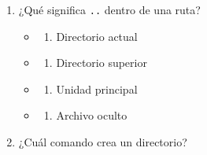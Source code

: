\documentclass[
  spanish,
  letterpaper,
]{scrbook}
\providecommand{\tightlist}{%
  \setlength{\itemsep}{0pt}\setlength{\parskip}{0pt}}
\begin{document}
\begin{enumerate}
  \begin{itemize}
  \tightlist
  \item
    \begin{enumerate}
    \def\labelenumii{\alph{enumii})}
    \tightlist
    \item
      \texttt{show}
    \end{enumerate}
  \item
    \begin{enumerate}
    \def\labelenumii{\alph{enumii})}
    \setcounter{enumii}{1}
    \tightlist
    \item
      \texttt{list}
    \end{enumerate}
  \item
    \begin{enumerate}
    \def\labelenumii{\alph{enumii})}
    \setcounter{enumii}{2}
    \tightlist
    \item
      \texttt{dir}
    \end{enumerate}
  \item
    \begin{enumerate}
    \def\labelenumii{\alph{enumii})}
    \setcounter{enumii}{3}
    \tightlist
    \item
      \texttt{type}
    \end{enumerate}
  \end{itemize}
\item
  ¿Qué significa \texttt{..} dentro de una ruta?

  \begin{itemize}
  \tightlist
  \item
    \begin{enumerate}
    \def\labelenumii{\alph{enumii})}
    \tightlist
    \item
      Directorio actual
    \end{enumerate}
  \item
    \begin{enumerate}
    \def\labelenumii{\alph{enumii})}
    \setcounter{enumii}{1}
    \tightlist
    \item
      Directorio superior
    \end{enumerate}
  \item
    \begin{enumerate}
    \def\labelenumii{\alph{enumii})}
    \setcounter{enumii}{2}
    \tightlist
    \item
      Unidad principal
    \end{enumerate}
  \item
    \begin{enumerate}
    \def\labelenumii{\alph{enumii})}
    \setcounter{enumii}{3}
    \tightlist
    \item
      Archivo oculto
    \end{enumerate}
  \end{itemize}
\item
  ¿Cuál comando crea un directorio?


\end{enumerate}
\end{document}
